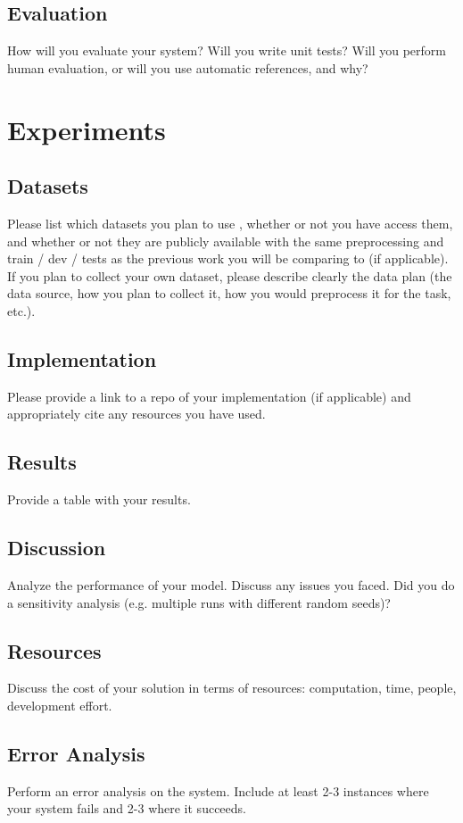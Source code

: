 \documentclass[11pt,a4paper]{article}
\begin{document}
\subsection{Evaluation} 
How will you evaluate your system? Will you write unit tests? Will you perform human evaluation, or will you use automatic references, and why?

\section{Experiments}

\subsection{Datasets}
Please list which datasets you plan to use , whether or not you have access them, and whether or not they are publicly available with the same preprocessing and train / dev / tests as the previous work you will be comparing to (if applicable). If you plan to collect your own dataset, please describe clearly the data plan (the data source, how you plan to collect it, how you would preprocess it for the task, etc.).

\subsection{Implementation} 
Please provide a link to a repo of your implementation (if applicable) and appropriately cite any resources you have used.

\subsection{Results}
Provide a table with your results.

\subsection{Discussion}
Analyze the performance of your model. Discuss any issues you faced. Did you do a sensitivity analysis (e.g. multiple runs with different random seeds)?

\subsection{Resources}
Discuss the cost of your solution in terms of resources: computation, time, people, development effort.


\subsection{Error Analysis}
Perform an error analysis on the system. Include at least 2-3 instances where your system fails and 2-3 where it succeeds.
\end{document}
